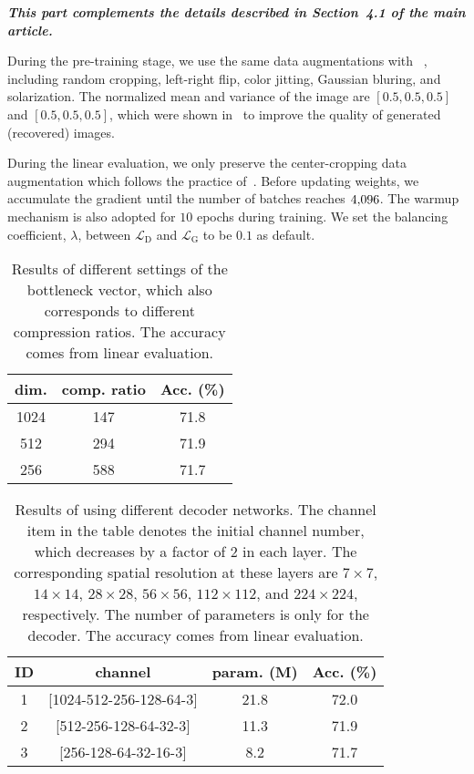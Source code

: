 \documentclass[10pt,twocolumn,letterpaper]{article}
\begin{document}
\textbf{\textit{This part complements the details described in Section~4.1 of the main article.}}

During the pre-training stage, we use the same data augmentations with ~\cite{grill2020bootstrap}, including random cropping, left-right flip, color jitting, Gaussian bluring, and solarization. The normalized mean and variance of the image are $[0.5,0.5,0.5]$ and $[0.5,0.5,0.5]$, which were shown in~\cite{inpainting} to improve the quality of generated (recovered) images.

During the linear evaluation, we only preserve the center-cropping data augmentation which follows the practice of~\cite{chen2020simple}. Before updating weights, we accumulate the gradient until the number of batches reaches $4\rm{,}096$. The warmup mechanism is also adopted for $10$ epochs during training. We set the balancing coefficient, $\lambda$, between $\mathcal{L}_\mathrm{D}$ and $\mathcal{L}_\mathrm{G}$ to be $0.1$ as default.

\setcounter{table}{7}
\begin{table}[]
\vspace{0.05in}
\fontsize{9.0}{10.5}\selectfont
\centering
\setlength{\tabcolsep}{3mm}
\begin{tabular}{c|c|c}
\toprule
dim.  &comp. ratio   & Acc. (\%) \\
\midrule
1024    &147  &71.8 \\ 
512     &294  &71.9 \\
256     &588  &71.7 \\
\bottomrule
\end{tabular}
\caption{Results of different settings of the bottleneck vector, which also corresponds to different compression ratios. The accuracy comes from linear evaluation.}
\label{tab:comp_rate}
\end{table}

\begin{table}[]
\vspace{0.05in}
\fontsize{9.0}{10.5}\selectfont
\centering
\setlength{\tabcolsep}{2mm}
\begin{tabular}{c|c|c|c}
\toprule
ID &channel  &param. (M)   & Acc. (\%) \\
\midrule
1   &[1024-512-256-128-64-3]    &21.8  &72.0 \\ 
2   &[512-256-128-64-32-3]     &11.3  &71.9 \\
3   &[256-128-64-32-16-3]     &8.2  &71.7 \\
\bottomrule
\end{tabular}
\caption{Results of using different decoder networks. The channel item in the table denotes the initial channel number, which decreases by a factor of $2$ in each layer. The corresponding spatial resolution at these layers are $7\times7$, $14\times14$, $28\times28$, $56\times56$, $112\times112$, and $224\times224$, respectively. The number of parameters is only for the decoder. The accuracy comes from linear evaluation.}
\label{tab:decoder}
\end{table}
\end{document}
